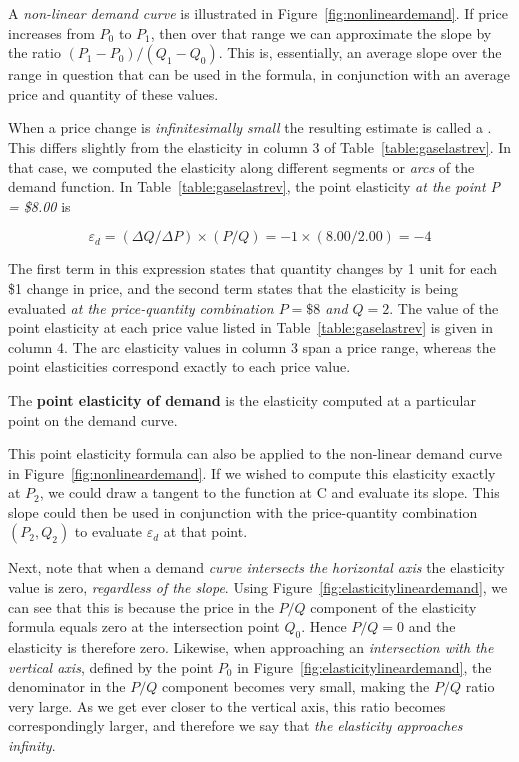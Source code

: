 A \textit{non-linear demand curve} is illustrated in Figure~\ref{fig:nonlineardemand}. If price increases from $P_0$ to $P_1$, then over that range we can approximate the slope by the ratio $(P_1-P_0)/(Q_1-Q_0)$. This is, essentially, an average slope over the range in question that can be used in the formula, in conjunction with an average price and quantity of these values. 



When a price change is \textit{infinitesimally small} the resulting estimate is called a . This differs slightly from the elasticity in column 3 of Table~\ref{table:gaselastrev}. In that case, we computed the elasticity along different segments or \textit{arcs} of the demand function. In Table~\ref{table:gaselastrev}, the point elasticity \textit{at the point P = \$8.00} is 

\begin{equation*}
\varepsilon_d=(\Delta Q/\Delta P)\times(P/Q)=-1\times (8.00/2.00)=-4
\end{equation*}

The first term in this expression states that quantity changes by 1 unit for each \$1 change in price, and the second term states that the elasticity is being evaluated \textit{at the price-quantity combination $P=\$8$ and $Q=2$}.  The value of the point elasticity at each price value listed in Table~\ref{table:gaselastrev} is given in column 4. The arc elasticity values in column 3 span a price range, whereas the point elasticities correspond exactly to each price value. 

\begin{DefBox}
The \textbf{point elasticity of demand} is the elasticity computed at a particular point on the demand curve.
\end{DefBox}

This point elasticity formula can also be applied to the non-linear demand curve in Figure~\ref{fig:nonlineardemand}. If we wished to compute this elasticity exactly at $P_2$, we could draw a tangent to the function at C and evaluate its slope. This slope could then be used in conjunction with the price-quantity combination $(P_2, Q_2)$ to evaluate $\varepsilon_d$ at that point. 

Next, note that when a demand \textit{curve intersects the horizontal axis} the elasticity value is zero, \textit{regardless of the slope}. Using Figure~\ref{fig:elasticitylineardemand}, we can see that this is because the price in the $P/Q$ component of the elasticity formula equals zero at the intersection point $Q_0$. Hence $P/Q=0$ and the elasticity is therefore zero. Likewise, when approaching an \textit{intersection with the vertical axis}, defined by the point $P_0$ in Figure~\ref{fig:elasticitylineardemand}, the denominator in the $P/Q$ component becomes very small, making the $P/Q$ ratio very large. As we get ever closer to the vertical axis, this ratio becomes correspondingly larger, and therefore we say that \textit{the elasticity approaches infinity}.

